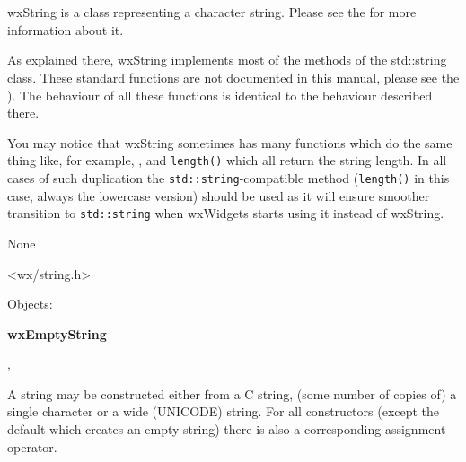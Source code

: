 \section{}\label{wxstring}

wxString is a class representing a character string. Please see the 
 for more information about it.

As explained there, wxString implements most of the methods of the std::string
class.
These standard functions are not documented in this manual, please see the
).
The behaviour of all these functions is identical to the behaviour described
there.

You may notice that wxString sometimes has many functions which do the same
thing like, for example, , 
 and {\tt length()} which all return the string
length. In all cases of such duplication the {\tt std::string}-compatible
method ({\tt length()} in this case, always the lowercase version) should be
used as it will ensure smoother transition to {\tt std::string} when wxWidgets
starts using it instead of wxString.


None


<wx/string.h>


Objects:

{\bf wxEmptyString}


, 



\label{constructorsinwxstring}

A string may be constructed either from a C string, (some number of copies of)
a single character or a wide (UNICODE) string. For all constructors (except the
default which creates an empty string) there is also a corresponding assignment
operator.

\\
\\


